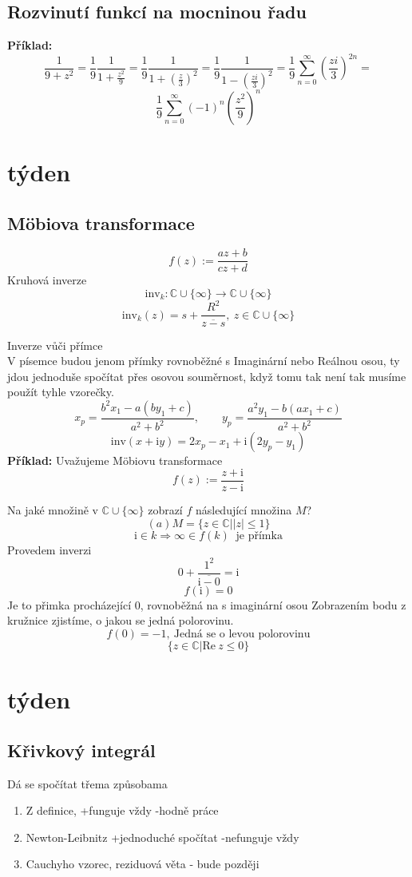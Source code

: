 \documentclass{article}
\newcommand{\mi}{\mathrm{i}}
\newcommand{\re}{\mathrm{Re}}
\newcommand{\inv}{\mathrm{inv}}
\begin{document}
        \subsection{Rozvinutí funkcí na mocninou řadu}
            {\bf Příklad:}
            \[\frac{1}{9+z^2}=\frac{1}{9}\frac{1}{1+\frac{z^2}{9}}=
            \frac{1}{9}\frac{1}{1+\left(\frac{z}{3}\right)^2}=
            \frac{1}{9}\frac{1}{1-\left(\frac{zi}{3}\right)^2}=
            \frac{1}{9}\sum_{n=0}^{\infty}\left(\frac{zi}{3}\right)^{2n}=\]
            \[\frac{1}{9}\sum_{n=0}^{\infty}(-1)^n\left(\frac{z^2}{9}\right)^{n}\]
    \section{týden}
        \subsection{M\"{o}biova transformace}
        \[f(z):=\frac{az+b}{cz+d}\]
        Kruhová inverze
        \[\inv_k:\mathbb{C}\cup\{\infty\}\to\mathbb{C}\cup\{\infty\}\]
        \[\inv_k(z)=s+\frac{R^2}{\overline{z-s}},\:z\in\mathbb{C}\cup\{\infty\}\]

        Inverze vůči přímce\\
        V písemce budou jenom přímky rovnoběžné s Imaginární nebo Reálnou osou,
        ty jdou jednoduše spočítat přes osovou souměrnost, když tomu tak není tak 
        musíme použít tyhle vzorečky.
        \[x_p=\frac{b^2x_1-a(by_1+c)}{a^2+b^2},\qquad 
        y_p=\frac{a^2y_1-b(ax_1+c)}{a^2+b^2}\]
        \[\inv(x+\mi y)=2x_p-x_1+\mi(2y_p-y_1)\]
    {\bf Příklad:}
        Uvažujeme M\"{o}biovu transformace
        \[f(z):=\frac{z+\mi}{z-\mi}\]

        Na jaké množině v $\mathbb{C}\cup\{\infty\}$ zobrazí $f$ následující množina $M$?
        \[(a)M=\{z\in\mathbb{C}||z|\leq 1\}\]
        \[\mi\in k\Rightarrow\infty\in f(k)\: \mbox{ je přímka}\]
        Provedem inverzi 
        \[0+\frac{1^2}{\overline{\mi-0}}=\mi\]
        \[f(\mi)=0\]
        Je to přimka procházející 0, rovnoběžná na s imaginární osou
        Zobrazením bodu z kružnice zjistíme, o jakou se jedná polorovinu.
        \[f(0)=-1, \:\mbox{Jedná se o levou polorovinu}\]
        \[\{z\in\mathbb{C}|\re\: z \leq 0\}\]
    \section{týden}
        \subsection{Křivkový integrál}
        Dá se spočítat třema způsobama
        \begin{enumerate}
            \item Z definice, +funguje vždy -hodně práce
            \item Newton-Leibnitz +jednoduché spočítat -nefunguje vždy
            \item Cauchyho vzorec, reziduová věta - bude později
        \end{enumerate}
\end{document}
